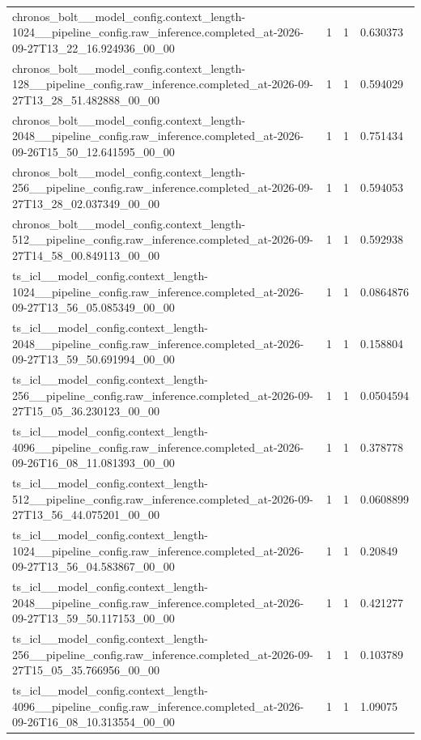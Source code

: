 \begin{tabular}{llll}
chronos\_bolt\_\_model\_config.context\_length-1024\_\_pipeline\_config.raw\_inference.completed\_at-2026-09-27T13\_22\_16.924936\_00\_00 & 1 & 1 & 0.630373 \\
chronos\_bolt\_\_model\_config.context\_length-128\_\_pipeline\_config.raw\_inference.completed\_at-2026-09-27T13\_28\_51.482888\_00\_00 & 1 & 1 & 0.594029 \\
chronos\_bolt\_\_model\_config.context\_length-2048\_\_pipeline\_config.raw\_inference.completed\_at-2026-09-26T15\_50\_12.641595\_00\_00 & 1 & 1 & 0.751434 \\
chronos\_bolt\_\_model\_config.context\_length-256\_\_pipeline\_config.raw\_inference.completed\_at-2026-09-27T13\_28\_02.037349\_00\_00 & 1 & 1 & 0.594053 \\
chronos\_bolt\_\_model\_config.context\_length-512\_\_pipeline\_config.raw\_inference.completed\_at-2026-09-27T14\_58\_00.849113\_00\_00 & 1 & 1 & 0.592938 \\
ts\_icl\_\_model\_config.context\_length-1024\_\_pipeline\_config.raw\_inference.completed\_at-2026-09-27T13\_56\_05.085349\_00\_00 & 1 & 1 & 0.0864876 \\
ts\_icl\_\_model\_config.context\_length-2048\_\_pipeline\_config.raw\_inference.completed\_at-2026-09-27T13\_59\_50.691994\_00\_00 & 1 & 1 & 0.158804 \\
ts\_icl\_\_model\_config.context\_length-256\_\_pipeline\_config.raw\_inference.completed\_at-2026-09-27T15\_05\_36.230123\_00\_00 & 1 & 1 & 0.0504594 \\
ts\_icl\_\_model\_config.context\_length-4096\_\_pipeline\_config.raw\_inference.completed\_at-2026-09-26T16\_08\_11.081393\_00\_00 & 1 & 1 & 0.378778 \\
ts\_icl\_\_model\_config.context\_length-512\_\_pipeline\_config.raw\_inference.completed\_at-2026-09-27T13\_56\_44.075201\_00\_00 & 1 & 1 & 0.0608899 \\
ts\_icl\_\_model\_config.context\_length-1024\_\_pipeline\_config.raw\_inference.completed\_at-2026-09-27T13\_56\_04.583867\_00\_00 & 1 & 1 & 0.20849 \\
ts\_icl\_\_model\_config.context\_length-2048\_\_pipeline\_config.raw\_inference.completed\_at-2026-09-27T13\_59\_50.117153\_00\_00 & 1 & 1 & 0.421277 \\
ts\_icl\_\_model\_config.context\_length-256\_\_pipeline\_config.raw\_inference.completed\_at-2026-09-27T15\_05\_35.766956\_00\_00 & 1 & 1 & 0.103789 \\
ts\_icl\_\_model\_config.context\_length-4096\_\_pipeline\_config.raw\_inference.completed\_at-2026-09-26T16\_08\_10.313554\_00\_00 & 1 & 1 & 1.09075 \\

\end{tabular}
